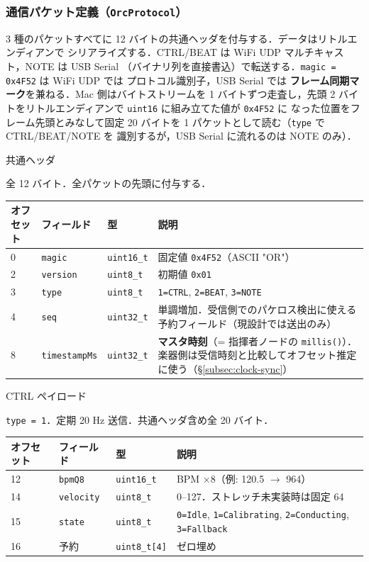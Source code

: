 \documentclass[lualatex,book,paper=a4paper,jafontsize=11.5pt,jafontscale=1.05]{jlreq}
\begin{document}
\subsubsection{通信パケット定義（\texttt{OrcProtocol}）}

3 種のパケットすべてに 12 バイトの共通ヘッダを付与する．データはリトルエンディアンで
シリアライズする．CTRL/BEAT は WiFi UDP マルチキャスト，NOTE は USB Serial
（バイナリ列を直接書込）で転送する．\texttt{magic = 0x4F52} は WiFi UDP では
プロトコル識別子，USB Serial では \textbf{フレーム同期マーク}を兼ねる．Mac 側はバイトストリームを
1 バイトずつ走査し，先頭 2 バイトをリトルエンディアンで \texttt{uint16} に組み立てた値が \texttt{0x4F52} に
なった位置をフレーム先頭とみなして固定 20 バイトを 1 パケットとして読む（\texttt{type} で CTRL/BEAT/NOTE を
識別するが，USB Serial に流れるのは NOTE のみ）．

\begin{apibox}{共通ヘッダ}
{\raggedright 全 12 バイト．全パケットの先頭に付与する．\par}\medskip
\begin{tabular}{l l l p{}}
\textbf{オフセット} & \textbf{フィールド} & \textbf{型} & \textbf{説明} \\
\midrule
0 & \texttt{magic}        & \texttt{uint16\_t} & 固定値 \texttt{0x4F52}（ASCII "OR"） \\
2 & \texttt{version}      & \texttt{uint8\_t}  & 初期値 \texttt{0x01} \\
3 & \texttt{type}         & \texttt{uint8\_t}  & \texttt{1=CTRL}, \texttt{2=BEAT}, \texttt{3=NOTE} \\
4 & \texttt{seq}          & \texttt{uint32\_t} & 単調増加．受信側でのパケロス検出に使える予約フィールド（現設計では送出のみ） \\
8 & \texttt{timestampMs}  & \texttt{uint32\_t} & \textbf{マスタ時刻}（= 指揮者ノードの \texttt{millis()}）．楽器側は受信時刻と比較してオフセット推定に使う（\S\ref{subsec:clock-sync}） \\
\end{tabular}
\end{apibox}

\begin{apibox}{CTRL ペイロード}
{\raggedright \texttt{type = 1}．定期 20 Hz 送信．共通ヘッダ含め全 20 バイト．\par}\medskip
\begin{tabular}{l l l p{}}
\textbf{オフセット} & \textbf{フィールド} & \textbf{型} & \textbf{説明} \\
\midrule
12 & \texttt{bpmQ8}    & \texttt{uint16\_t}   & BPM $\times 8$（例: 120.5 $\to$ 964） \\
14 & \texttt{velocity} & \texttt{uint8\_t}    & 0--127．ストレッチ未実装時は固定 64 \\
15 & \texttt{state}    & \texttt{uint8\_t}    & \texttt{0=Idle}, \texttt{1=Calibrating}, \texttt{2=Conducting}, \texttt{3=Fallback} \\
16 & 予約              & \texttt{uint8\_t[4]} & ゼロ埋め \\
\end{tabular}
\end{apibox}
\end{document}
